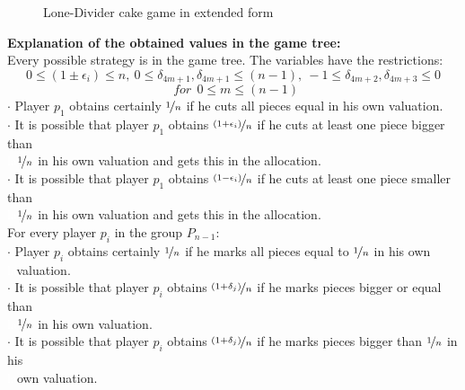 \begin{figure}[h!]
\begin{center}
	\caption{Lone-Divider cake game in extended form}
\end{center}
\end{figure}
\newline
\textbf{Explanation of the obtained values in the game tree:}\\
\newline
Every possible strategy is in the game tree. The variables have the restrictions: $$0 \leq (1\pm\epsilon_i)\leq n,\:0 \leq \delta_{4m+1},\delta_{4m+1} \leq (n-1),\:-1 \leq \delta_{4m+2},\delta_{4m+3} \leq 0$$$$\:\:for\:\:0 \leq m \leq (n-1) $$
$\cdot$ Player $p_1$ obtains certainly $\nicefrac{1}{n}$ if he cuts all pieces equal in his own valuation.\\
$\cdot$ It is possible that player $p_1$ obtains $\nicefrac{(1+\epsilon_i)}{n}$ if he cuts at least one piece bigger than\\\textcolor{white}{la}\textcolor{black}{}$\nicefrac{1}{n}$ in his own valuation and gets this in the allocation.\\
$\cdot$ It is possible that player $p_1$ obtains $\nicefrac{(1-\epsilon_i)}{n}$ if he cuts at least one piece smaller than\\\textcolor{white}{la}\textcolor{black}{}$\nicefrac{1}{n}$ in his own valuation and gets this in the allocation.\\
\newline
For every player $p_i$ in the group $P_{n-1}$:\\
\newline
$\cdot$ Player $p_i$ obtains certainly $\nicefrac{1}{n}$ if he marks all pieces equal to $\nicefrac{1}{n}$ in his own\\\textcolor{white}{la}\textcolor{black}{}valuation.\\
$\cdot$ It is possible that player $p_i$ obtains $\nicefrac{(1+\delta_j)}{n}$ if he marks pieces bigger or equal than\\\textcolor{white}{la}\textcolor{black}{}$\nicefrac{1}{n}$ in his own valuation.\\
$\cdot$ It is possible that player $p_i$ obtains $\nicefrac{(1+\delta_j)}{n}$ if he marks pieces bigger than $\nicefrac{1}{n}$ in his\\\textcolor{white}{la}\textcolor{black}{}own valuation.\\
